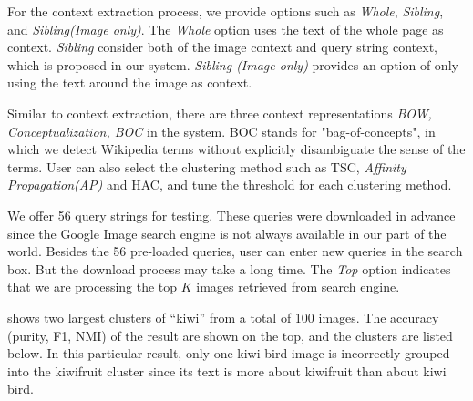 For the context extraction process, we provide options such as {\em Whole},
{\em Sibling}, and {\em Sibling(Image only)}.
The \textit{Whole} option uses the text of the whole page as context.
\textit{Sibling} consider both of the image context and query string context,
which is proposed in our system.
\textit{Sibling (Image only)} provides an option of only using the text
around the image as context.

Similar to context extraction, there are three context representations \textit{BOW, Conceptualization, BOC} in the system.
BOC stands for "bag-of-concepts", in which we detect Wikipedia terms without explicitly
disambiguate the sense of the terms.
User can also select the clustering method such as
TSC, \textit{Affinity Propagation(AP)}\cite{Frey07ap} and HAC, and tune the threshold for each clustering method.

We offer 56 query strings for testing.
These queries were downloaded in advance since the
Google Image search engine is not always available in
our part of the world. Besides the 56 pre-loaded queries,
user can enter new queries in the search box. But the download process
may take a long time. The \textit{Top} option
indicates that we are processing the top $K$ images
retrieved from search engine.

 shows two largest clusters of ``kiwi'' from a total
of 100 images.
The accuracy (purity, F1, NMI) of the result are shown on the top,
and the clusters are listed below.
In this particular result, only one kiwi bird image is incorrectly
grouped into the kiwifruit cluster since its text is more about kiwifruit
than about kiwi bird.

